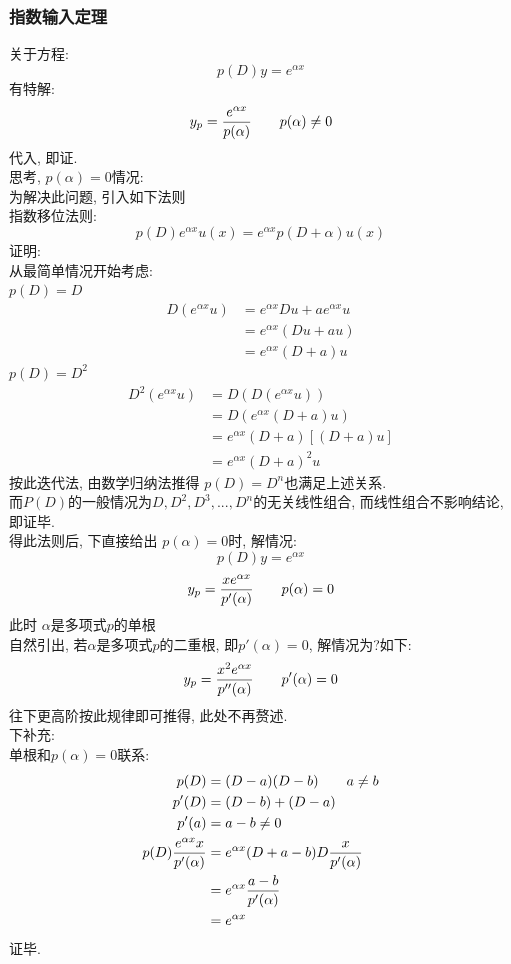 \subsubsection{\large 指数输入定理}
关于方程:
\[ p(D) y = e^{\alpha x} \]
有特解:
\[ y_p = \frac{e^{\alpha x}}{p(\alpha)}  \hspace*{2em} p(\alpha) \neq 0 \]
代入, 即证.\\
思考, $p(\alpha) = 0$情况:\\
为解决此问题, 引入如下法则\\
指数移位法则:
\[ p(D) e^{\alpha x} u(x) = e^{\alpha x} p(D + \alpha) u(x)    \]
证明:\\
从最简单情况开始考虑:\\
$p(D) = D$
\begin{align*}
D(e^{\alpha x} u) &= e^{\alpha x} D u + a e^{\alpha x} u  \\
                &= e^{\alpha x} (D u + a u)  \\
                &= e^{\alpha x} (D + a) u 
\end{align*}
$p(D) = D^2$
\begin{align*}
D^2(e^{\alpha x} u) &= D(D(e^{\alpha x} u)) \\
                &= D(e^{\alpha x} (D + a) u)  \\
                &= e^{\alpha x} (D + a) [(D + a) u]  \\
                &= e^{\alpha x} ( D + a)^2 u 
\end{align*}
按此迭代法, 由数学归纳法推得 $p(D) = D^n$也满足上述关系.\\
而$P(D)$的一般情况为$D, D^2, D^3, ..., D^n$的无关线性组合, 
而线性组合不影响结论, 即证毕.\\
得此法则后, 下直接给出 $p(\alpha) = 0$时, 解情况:
\[ p(D) y = e^{\alpha x} \]
\[ y_p = \frac{x e^{\alpha x}}{p'(\alpha)}  \hspace*{2em} p(\alpha) = 0 \]
此时 $\alpha$是多项式$p$的单根\\
自然引出, 若$\alpha$是多项式$p$的二重根, 
即$p'(\alpha) = 0$, 解情况为?如下:
\[ y_p = \frac{x^2 e^{\alpha x}}{p''(\alpha)}  \hspace*{2em} p'(\alpha) = 0 \]
往下更高阶按此规律即可推得, 此处不再赘述.\\
下补充:\\
单根和$p(\alpha) = 0$联系:
\begin{align*}
    p(D)  &= (D - a) (D - b) \hspace*{2em} a \neq b\\
    p'(D) &= (D - b) + (D - a)  \\
    p'(a) &= a - b \neq 0 \\
    p(D) \frac{e^{\alpha x}x}{p'(\alpha)}   &= e^{\alpha x} ( D + a - b)D \frac{x}{p'(\alpha)} \\
            &= e^{\alpha x} \frac{a-b}{p'(\alpha)}\\
            &= e^{\alpha x}
\end{align*}
证毕.
